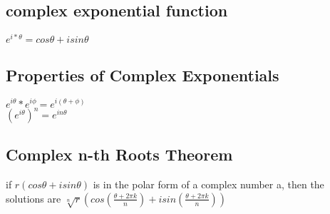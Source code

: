 \documentclass[12pt]{article}
\begin{document}
\subsection{complex exponential function}
$e^{i*\theta}= cos\theta+isin\theta$
\subsection{Properties of Complex Exponentials}
$e^{i\theta}*e^{i\phi}=e^{i(\theta+\phi)}$\\
$(e^{i\theta})^n=e^{in\theta}$
\subsection{Complex n-th Roots Theorem}
if $r(cos\theta + isin\theta)$ is in the polar form of a complex number a, then
the solutions are $\sqrt[n]{r}(cos(\frac{\theta + 2\pi
  k}{n})+isin(\frac{\theta+2\pi k}{n}))$
\end{document}
